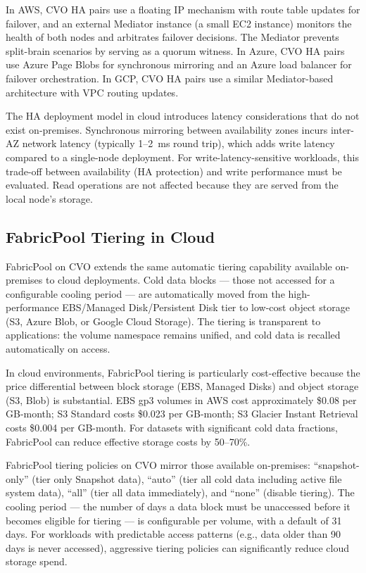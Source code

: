 In AWS, CVO HA pairs use a floating IP mechanism with route table updates for
failover, and an external Mediator instance (a small EC2 instance) monitors
the health of both nodes and arbitrates failover decisions. The Mediator
prevents split-brain scenarios by serving as a quorum witness. In Azure, CVO
HA pairs use Azure Page Blobs for synchronous mirroring and an Azure load
balancer for failover orchestration. In GCP, CVO HA pairs use a similar
Mediator-based architecture with VPC routing updates.

The HA deployment model in cloud introduces latency considerations that do not
exist on-premises. Synchronous mirroring between availability zones incurs
inter-AZ network latency (typically 1--2~ms round trip), which adds write
latency compared to a single-node deployment. For write-latency-sensitive
workloads, this trade-off between availability (HA protection) and write
performance must be evaluated. Read operations are not affected because they
are served from the local node's storage.

\subsection{FabricPool Tiering in Cloud}

FabricPool on CVO extends the same automatic tiering capability available
on-premises to cloud deployments. Cold data blocks --- those not accessed for a
configurable cooling period --- are automatically moved from the
high-performance EBS/Managed Disk/Persistent Disk tier to low-cost object
storage (S3, Azure Blob, or Google Cloud Storage). The tiering is transparent
to applications: the volume namespace remains unified, and cold data is
recalled automatically on access.

In cloud environments, FabricPool tiering is particularly cost-effective
because the price differential between block storage (EBS, Managed Disks) and
object storage (S3, Blob) is substantial. EBS gp3 volumes in AWS cost
approximately \$0.08 per GB-month; S3 Standard costs \$0.023 per GB-month; S3
Glacier Instant Retrieval costs \$0.004 per GB-month. For datasets with
significant cold data fractions, FabricPool can reduce effective storage costs
by 50--70\%.

FabricPool tiering policies on CVO mirror those available on-premises:
``snapshot-only'' (tier only Snapshot data), ``auto'' (tier all cold data
including active file system data), ``all'' (tier all data immediately), and
``none'' (disable tiering). The cooling period --- the number of days a data
block must be unaccessed before it becomes eligible for tiering --- is
configurable per volume, with a default of 31 days. For workloads with
predictable access patterns (e.g., data older than 90 days is never
accessed), aggressive tiering policies can significantly reduce cloud storage
spend.

